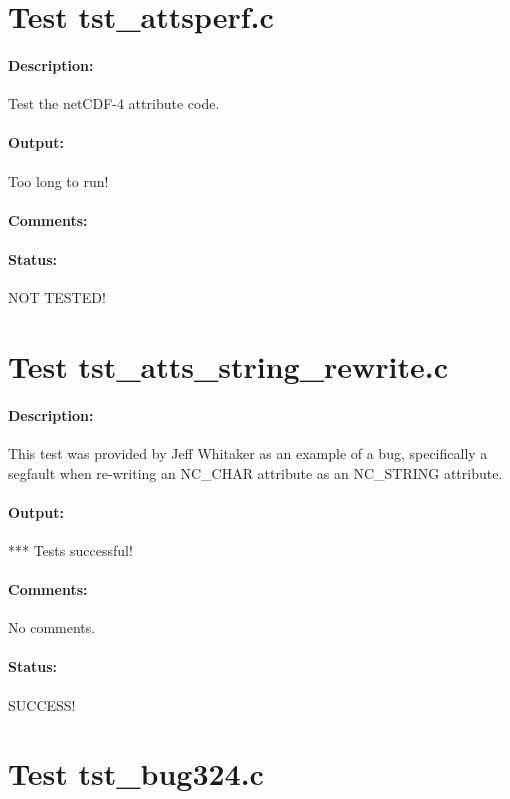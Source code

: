 \section{Test tst\_attsperf.c}

\paragraph{Description:} Test the netCDF-4 attribute code.

\paragraph{Output:} Too long to run!

\paragraph{Comments:}

\paragraph{Status:} NOT TESTED!

\section{Test tst\_atts\_string\_rewrite.c}

\paragraph{Description:} This test was provided by Jeff Whitaker as an example of a bug,
specifically a segfault when re-writing an NC\_CHAR attribute as
an NC\_STRING attribute.

\paragraph{Output:} *** Tests successful!

\paragraph{Comments:} No comments.

\paragraph{Status:} SUCCESS!

\section{Test tst\_bug324.c}

